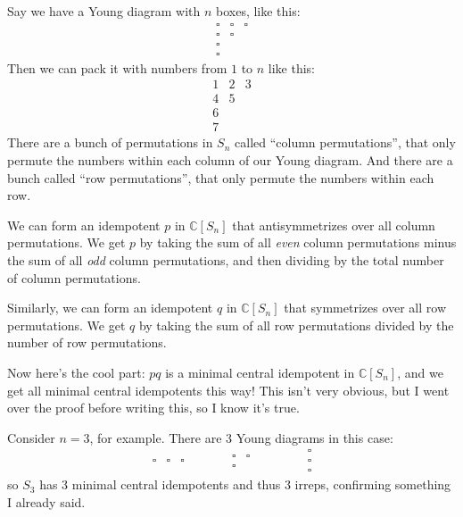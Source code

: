 \documentclass{article}
\begin{document}
Say we have a Young diagram with \(n\) boxes, like this: \[
  \begin{array}{lll}
    \square&\square&\square
  \\\square&\square&
  \\\square&&
  \\\square&&
  \end{array}
\] Then we can pack it with numbers from \(1\) to \(n\) like this: \[
  \begin{array}{lll}
    1&2&3
  \\4&5&
  \\6&&
  \\7&&
  \end{array}
\] There are a bunch of permutations in \(S_n\) called ``column
permutations'', that only permute the numbers within each column of our
Young diagram. And there are a bunch called ``row permutations'', that
only permute the numbers within each row.

We can form an idempotent \(p\) in \(\mathbb{C}[S_n]\) that
antisymmetrizes over all column permutations. We get \(p\) by taking the
sum of all \emph{even} column permutations minus the sum of all
\emph{odd} column permutations, and then dividing by the total number of
column permutations.

Similarly, we can form an idempotent \(q\) in \(\mathbb{C}[S_n]\) that
symmetrizes over all row permutations. We get \(q\) by taking the sum of
all row permutations divided by the number of row permutations.

Now here's the cool part: \(pq\) is a minimal central idempotent in
\(\mathbb{C}[S_n]\), and we get all minimal central idempotents this
way! This isn't very obvious, but I went over the proof before writing
this, so I know it's true.

Consider \(n = 3\), for example. There are 3 Young diagrams in this
case: \[
  \begin{array}{lll}
    \square&\square&\square
  \end{array}
  \qquad\quad
  \begin{array}{lll}
    \square&\square&
  \\\square
  \end{array}
  \qquad\quad
  \begin{array}{lll}
    \square
  \\\square
  \\\square
  \end{array}
\] so \(S_3\) has 3 minimal central idempotents and thus 3 irreps,
confirming something I already said.
\end{document}
